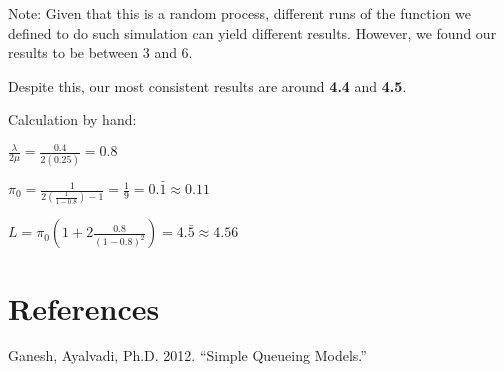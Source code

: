 \documentclass[]{article}
\begin{document}
Note: Given that this is a random process, different runs of the
function we defined to do such simulation can yield different results.
However, we found our results to be between 3 and 6.

Despite this, our most consistent results are around \textbf{4.4} and
\textbf{4.5}.

\newpage

Calculation by hand:

\(\frac{\lambda}{2 \mu} = \frac{0.4}{2(0.25)} = 0.8\)

\(\pi_0 = \frac{1}{2(\frac{1}{1-0.8}) - 1} = \frac{1}{9} = 0. \bar{1} \approx 0.11\)

\(L = \pi_0 (1 + 2 \frac{0.8}{(1-0.8)^2}) = 4. \bar{5} \approx 4.56\)

\hypertarget{references}{%
\section*{References}\label{references}}

\hypertarget{refs}{}
\leavevmode\hypertarget{ref-qm1}{}%
Ganesh, Ayalvadi, Ph.D. 2012. ``Simple Queueing Models.''
\end{document}
